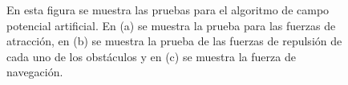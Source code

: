 \begin{figure}[ht!]
     \begin{center}
    \end{center}
  \captionsetup{font=footnotesize}
    \caption{\label{f:APF}En esta figura se muestra las pruebas para el algoritmo de campo potencial 
    artificial. En (a) se muestra la prueba para las fuerzas de atracción, en (b) se muestra la
    prueba de las fuerzas de repulsión de cada uno de los obstáculos y en (c) se muestra la fuerza
    de navegación.}
\end{figure}
